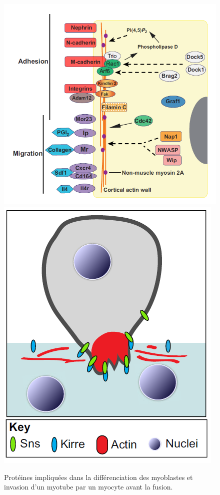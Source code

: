 \documentclass{report}
\begin{document}
\begin{figure}
\includegraphics[scale=0.3]{Figures/Myoblast_pathways.png} 
\includegraphics[scale=0.3]{Figures/Myoblast_invasion.png} 
\caption{Protéines impliquées dans la différenciation des myoblastes et invasion d'un myotube par un myocyte avant la fusion.}
\end{figure}
\end{document}
